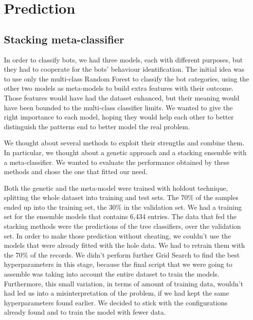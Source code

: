 \chapter{Prediction}
\label{capitolo6}
\thispagestyle{empty}
\section{Stacking meta-classifier}
In order to classify bots, we had three models, each with different purposes, but they had to cooperate for the bots' behaviour identification.
The initial idea was to use only the multi-class Random Forest to classify the bot categories, using the other two models as meta-models to build extra features with their outcome.
Those features would have had the dataset enhanced, but their meaning would have been bounded to the multi-class classifier limits.
We wanted to give the right importance to each model, hoping they would help each other to better distinguish the patterns end to better model the real problem.

We thought about several methods to exploit their strengths and combine them. In particular, we thought about a genetic approach and a stacking ensemble with a meta-classifier. 
We wanted to evaluate the performance obtained by these methods and chose the one that fitted our need.

Both the genetic and the meta-model were trained with holdout technique, splitting the whole dataset into training and test sets. The 70\% of the samples ended up into the training set, the 30\% in the validation set.
We had a training set for the ensemble models that contains 6,434 entries.
The data that fed the stacking methods were the predictions of the tree classifiers, over the validation set.
In order to make those prediction without cheating, we couldn't use the models that were already fitted with the hole data. We had to retrain them with the 70\% of the records. 
We didn't perform further Grid Search to find the best hyperparameters in this stage, because the final script that we were going to assemble was taking into account the entire dataset to train the models. Furthermore, this small variation, in terms of amount of training data, wouldn't had led us into a misinterpretation of the problem, if we had kept the same hyperparameters found earlier.
We decided to stick with the configurations already found and to train the model with fewer data.

